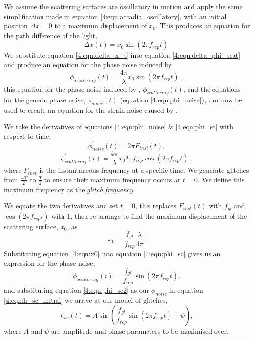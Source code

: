 We assume the scattering surfaces are oscillatory in motion and apply the same simplification made in equation \ref{4:eqn:accadia_oscillatory}, with an initial position $\Delta x = 0$ to a maximum displacement of $x_{0}$. This produces an equation for the path difference of the light,
%
\begin{equation}
  \Delta x(t) = x_{0} \sin(2 \pi f_{rep} t).
  \label{4:eqn:delta_x_t}
\end{equation}
%
We substitute equation \ref{4:eqn:delta_x_t} into equation \ref{4:eqn:delta_phi_scat} and produce an equation for the phase noise induced by \scl{}
%
\begin{equation}
  \phi_{scattering}(t) = \frac{4 \pi}{\lambda} x_{0} \sin(2 \pi f_{rep} t) \;,
  \label{4:eqn:phi_sc}
\end{equation}
%
this equation for the phase noise induced by \scl{}, $\phi_{scattering}(t)$, and the equations for the generic phase noise, $\phi_{noise}(t)$ (equation \ref{4:eqn:phi_noise}), can now be used to create an equation for the strain noise caused by \scl{}.

We take the derivatives of equations \ref{4:eqn:phi_noise} $\&$ \ref{4:eqn:phi_sc} with respect to time:
%
\begin{equation}
  \phi_{noise} ^\prime (t) = 2 \pi F_{inst} (t),
\end{equation}
%
\begin{equation}
  \phi_{scattering} ^\prime (t) = \frac{4 \pi}{\lambda} x_{0} 2 \pi f_{rep} \cos(2 \pi f_{rep} t) \;,
\end{equation}
%
where $F_{inst}$ is the instantaneous frequency at a specific time. We generate \scl{} glitches from $\frac{-T}{2}$ to $\frac{T}{2}$ to ensure their maximum frequency occurs at $t = 0$. We define this maximum frequency as the \emph{glitch frequency}.

We equate the two derivatives and set $t = 0$, this replaces $F_{inst}(t)$ with $f_{gl}$ and $\cos(2\pi f_{rep} t)$ with $1$, then re-arrange to find the maximum displacement of the scattering surface, $x_{0}$, as
%
\begin{equation}
  x_{0} = \frac{f_{gl}}{f_{rep}} \frac{\lambda}{4 \pi}.
  \label{4:eqn:x0}
\end{equation}
%
Substituting equation \ref{4:eqn:x0} into equation \ref{4:eqn:phi_sc} gives us an expression for the \scl{} phase noise,
%
\begin{equation}
  \phi_{scattering}(t) = \frac{f_{gl}}{f_{rep}} \sin(2 \pi f_{rep} t),
  \label{4:eqn:phi_sc2}
\end{equation}
%
and substituting equation \ref{4:eqn:phi_sc2} as our $\phi_{noise}$ in equation \ref{4:eqn:h_sc_initial} we arrive at our model of \scl{} glitches,
%
\begin{equation}
  h_{sc}(t) = A \sin\left(\frac{f_{gl}}{f_{rep}} \sin(2 \pi f_{rep} t) + \psi\right),
  \label{4:eqn:model}
\end{equation}
%
where $A$ and $\psi$ are amplitude and phase parameters to be maximised over.

